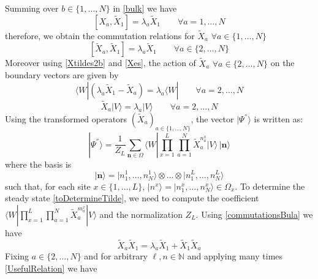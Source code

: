 \documentclass[11pt]{article}
\numberwithin{equation}{section}
\numberwithin{equation}{subsection}
\newcommand{\Xt}{\tilde{X}}
\begin{document}
Summing over $b\in \{1,\ldots,N\}$ in \eqref{bulk} we have
\begin{equation} 
	\left[X_{a},\Xt_{1}\right]=\lambda_{a}\Xt_{1}\qquad\forall a=1,\ldots,N
\end{equation}
therefore, we obtain the commutation relations for $\Xt_{a}$ $\forall a\in \{1,\ldots,N\}$
\begin{equation}\label{commutationsBula}
	\left[\Xt_{a},\Xt_{1}\right]=\lambda_{a}\Xt_{1}\qquad \forall a\in \{2,\ldots,N\}
\end{equation}
Moreover using \eqref{Xtildes2b} and \eqref{Xes}, the action of $\Xt_{a}$ $\forall a\in \{2,\ldots,N\}$ on the boundary vectors are given by 
\begin{equation}\label{commLEFT}
	\langle W|\left(\lambda_{a}\Xt_{1}-\Xt_{a}\right)=\lambda_{a}\langle W|\qquad\forall a=2,\ldots,N
\end{equation}
\begin{equation}\label{commRIGHT}
	\Xt_{a} |V\rangle= \lambda_{a}|V\rangle\qquad\forall a=2,\ldots,N
\end{equation} 
Using the transformed operators $(\widetilde{X}_{a})_{a\in\{1,\ldots,N\}}$, the vector $|\Psi^{''}\rangle$ is written as:
\begin{equation}\label{toDetermineTilde}
	|\Psi^{''}\rangle = \frac{1}{Z_{L}}\sum_{\mathbf{n}\in \Omega}\langle W|\prod_{x=1}^{L}\prod_{a=1}^{N}\widetilde{X}_{a}^{n_{a}^{x}}
	|V \rangle \,|\mathbf{n}\rangle
\end{equation}
where the basis is 
$$
|\mathbf{n}\rangle =|n_{1}^{1},\ldots,n_{N}^{1}\rangle \otimes \ldots\otimes |n_{1}^{L},\ldots,n_{N}^{L}\rangle
$$
such that, for each site $x\in \{1,\ldots,L\}$, $|n^{x}\rangle=|n_{1}^{x},\ldots,n_{N}^{x}\rangle\in \Omega_{x}$. 
To determine the steady state \eqref{toDetermineTilde}, we need to compute the coefficient $\langle W|\prod_{x=1}^{L}\prod_{a=1}^{N}\widetilde{X}_{a}^{m_{a}^{x}}
|V \rangle$ and the normalization $Z_{L}$. Using \eqref{commutationsBula} we have
\begin{equation}\label{UsefulRelation}
	\widetilde{X}_{a}\widetilde{X}_{1}=\lambda_{a}\widetilde{X}_{1}+\widetilde{X}_{1}\widetilde{X}_{a}
\end{equation}
Fixing $ a\in \{2,\ldots,N\}$ and for arbitrary $ \ell,n\in \mathbb{N}$ and applying many times \eqref{UsefulRelation} we have
\end{document}
